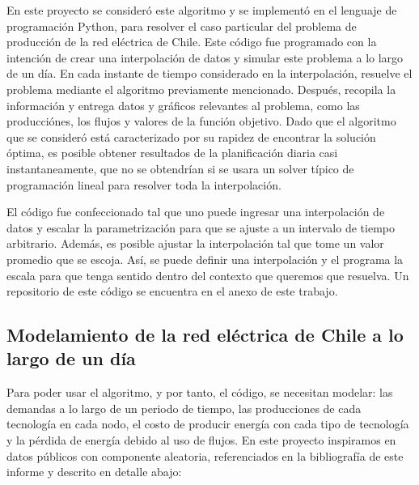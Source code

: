 \documentclass[12pt,twoside]{article}
\begin{document}
	\hspace{1cm} En este proyecto se consider\'o este algoritmo y se implement\'o en el lenguaje de programaci\'on Python, para resolver el caso particular del problema de producci\'on de la red el\'ectrica de Chile. Este c\'odigo fue programado con la intenci\'on de crear una interpolaci\'on de datos y simular este problema a lo largo de un d\'ia. En cada instante de tiempo considerado en la interpolaci\'on, resuelve el problema mediante el algoritmo previamente mencionado. Despu\'es, recopila la informaci\'on y entrega datos y gr\'aficos relevantes al problema, como las producci\'ones, los flujos y valores de la funci\'on objetivo. Dado que el algoritmo que se consider\'o est\'a caracterizado por su rapidez de encontrar la soluci\'on \'optima, es posible obtener resultados de la planificaci\'on diaria casi instantaneamente, que no se obtendr\'ian si se usara un solver t\'ipico de programaci\'on lineal para resolver toda la interpolaci\'on.
	
	\hspace{1cm} El c\'odigo fue confeccionado tal que uno puede ingresar una interpolaci\'on de datos y escalar la parametrizaci\'on para que se ajuste a un intervalo de tiempo arbitrario. Adem\'as, es posible ajustar la interpolaci\'on tal que tome un valor promedio que se escoja. As\'i, se puede definir una interpolaci\'on y el programa la escala para que tenga sentido dentro del contexto que queremos que resuelva. Un repositorio de este c\'odigo se encuentra en el anexo de este trabajo.
	
	\subsection{Modelamiento de la red el\'ectrica de Chile a lo largo de un d\'ia}
	
	\hspace{1cm} Para poder usar el algoritmo, y por tanto, el c\'odigo, se necesitan modelar: las demandas a lo largo de un periodo de tiempo, las producciones de cada tecnolog\'ia en cada nodo, el costo de producir energ\'ia con cada tipo de tecnolog\'ia y la p\'erdida de energ\'ia debido al uso de flujos. En este proyecto inspiramos en datos p\'ublicos con componente aleatoria, referenciados en la bibliograf\'ia de este informe y descrito en detalle abajo:
	
\end{document}
